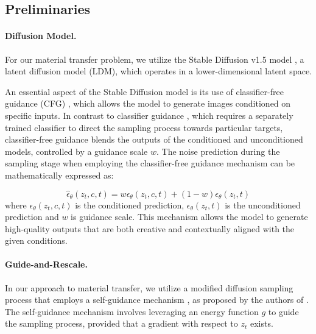 
\subsection{Preliminaries}
\paragraph{Diffusion Model.} For our material transfer problem, we utilize the Stable Diffusion v1.5 model \cite{rombach2022high}, a latent diffusion model (LDM), which operates in a lower-dimensional latent space.


An essential aspect of the Stable Diffusion model is its use of classifier-free guidance (CFG) \cite{ho2022classifier},  which allows the model to generate images conditioned on specific inputs. In contrast to classifier guidance \cite{dhariwal2021diffusion}, which requires a separately trained classifier to direct the sampling process towards particular targets, classifier-free guidance blends the outputs of the conditioned and unconditioned models, controlled by a guidance scale $w$.  The noise prediction during the sampling stage when employing the classifier-free guidance mechanism can be mathematically expressed as:

\vspace{-0.5cm}
\begin{equation}
  \hat{\epsilon}_{\theta}(z_{t}, c, t) = w\epsilon_{\theta}(z_{t}, c, t) + (1-w)\epsilon_{\theta}(z_{t}, t) 
  \label{eq:cfg}
\end{equation}
where $\epsilon_{\theta}(z_{t}, c, t)$ is the conditioned prediction, $\epsilon_{\theta}(z_{t}, t)$ is the unconditioned prediction and $w$ is guidance scale. This mechanism allows the model to generate high-quality outputs that are both creative and contextually aligned with the given conditions.

\paragraph{Guide-and-Rescale.}

In our approach to material transfer, we utilize a modified diffusion sampling process that employs a self-guidance mechanism \cite{epstein2023diffusion}, as proposed by the authors of \cite{titov2024guideandrescaleselfguidancemechanismeffective}. The self-guidance mechanism involves leveraging an energy function $g$ to guide the sampling process, provided that a gradient with respect to $z_t$ exists.


